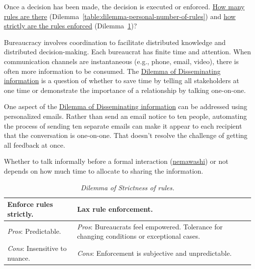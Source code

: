 Once a decision has been made, the decision is executed or enforced. \hyperref[table:dilemma-personal-number-of-rules]{How many rules are there} (Dilemma~\ref{table:dilemma-personal-number-of-rules}) and
\hyperref[table:dilemma-personal-rule-strictness-lax]{how strictly are the rules enforced} (Dilemma~\ref{table:dilemma-personal-rule-strictness-lax})?

Bureaucracy involves coordination to facilitate distributed knowledge and distributed decision-making. Each bureaucrat has finite time and attention. When communication channels are instantaneous (e.g., phone, email, video), there is often more information to be consumed.
The \hyperref[table:dilemma-personal-disseminate-one-by-one]{Dilemma of Disseminating information} is a question of whether to save time by telling all stakeholders at one time or demonstrate the importance of a relationship by talking one-on-one. 


One aspect of the \hyperref[table:dilemma-personal-disseminate-one-by-one]{Dilemma of Disseminating information} can be addressed using personalized emails. Rather than send an email notice to ten people, automating the process of sending ten separate emails can make it appear to each recipient that the conversation is one-on-one.  That doesn't resolve the challenge of getting all feedback at once.

Whether to talk informally before a formal interaction (\href{https://en.wikipedia.org/wiki/Nemawashi}{nemawashi}) 
\iftoggle{WPinmargin}{\marginpar{$>$Wikipedia: Nemawashi}}{}
or not depends on how much time to allocate to sharing the information. 

\begin{center}
\begin{table}[H] %
\begin{tabular}{ | m{\dilemmatablewidth}| m{\dilemmatablewidth} | } 
  \hline
  \textbf{Enforce rules strictly.} & 
  \textbf{Lax rule enforcement.} \\ 
  \hline
  \textit{Pros}: Predictable. &
  \textit{Pros}: Bureaucrats feel empowered. Tolerance for changing conditions or exceptional cases. \\
  \hline
  \textit{Cons}: Insensitive to nuance. & 
  \textit{Cons}: Enforcement is subjective and unpredictable.  \\  
  \hline
\end{tabular}
\caption{
\textit{Dilemma of Strictness of rules.}
}
\label{table:dilemma-personal-rule-strictness-lax}
\end{table}
\end{center}

